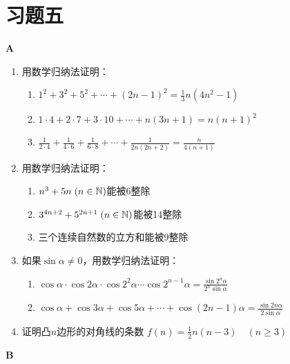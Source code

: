 \section*{习题五}

\begin{center}
    \bfseries A
\end{center}

\begin{enumerate}
    \item 用数学归纳法证明：
\begin{enumerate}[(1)]
    \item $1^2+3^2+5^2+\cdots+(2n-1)^2=\frac{1}{3}n(4n^2-1)$
    \item $1\cdot 4+2\cdot 7+3\cdot 10+\cdots+n(3n+1)=n(n+1)^2$
    \item $\frac{1}{2\cdot 4}+\frac{1}{4\cdot 6}+\frac{1}{6\cdot 8}+\cdots+\frac{1}{2n (2n+2)}=\frac{n}{4(n+1)}$
\end{enumerate}
    \item 用数学归纳法证明：
\begin{enumerate}[(1)]
    \item $n^3+5n\; (n\in\mathbb{N})$能被6整除
    \item $3^{4n+2}+5^{2n+1}\; (n\in\mathbb{N})$能被14整除
    \item 三个连续自然数的立方和能被9整除
\end{enumerate}
    \item 如果$\sin\alpha\ne 0$，用数学归纳法证明：
\begin{enumerate}[(1)]
    \item $\cos\alpha\cdot \cos2\alpha\cdot \cos2^2\alpha\cdots \cos2^{n-1}\alpha=\frac{\sin2^n\alpha}{2^n\sin\alpha}$
    \item $\cos\alpha+\cos3\alpha+\cos5\alpha+\cdots+\cos(2n-1)\alpha=\frac{\sin 2n\alpha}{2\sin\alpha}$
\end{enumerate}
    \item 证明凸$n$边形的对角线的条数 $f(n)=\frac{1}{2}n(n-3)\quad (n\ge 3)$
\end{enumerate}

\begin{center}
    \bfseries B
\end{center}

